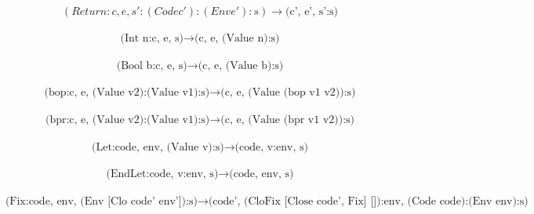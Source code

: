 \documentclass[10pt]{article}
\begin{document}
\ \\
\[
        {(Return:c, e, s':(Code c'):(Env e'):s)} \rightarrow \text{(c', e', s':s)}  
\]
\ \\
\[
        \text{(Int n:c, e, s)} \rightarrow \text{(c, e, (Value n):s)}  
\]
\ \\
\[
        \text{(Bool b:c, e, s)} \rightarrow \text{(c, e, (Value b):s)}  
\]
\ \\
\[
        \text{(bop:c, e, (Value v2):(Value v1):s)} \rightarrow \text{(c, e, (Value (bop v1 v2)):s)}  
\]
\ \\
\[
        \text{(bpr:c, e, (Value v2):(Value v1):s)} \rightarrow \text{(c, e, (Value (bpr v1 v2)):s)}  
\]
\ \\
\[
        \text{(Let:code, env, (Value v):s)} \rightarrow \text{(code, v:env, s)} 
\]
\ \\

\[
        \text{(EndLet:code, v:env, s)} \rightarrow \text{(code, env, s)}  
\]
\ \\
\[
        \text{(Fix:code, env, (Env [Clo code' env']):s)} \rightarrow \text{(code', (CloFix [Close code', Fix] []):env, (Code code):(Env env):s)}  
\]
\end{document}

